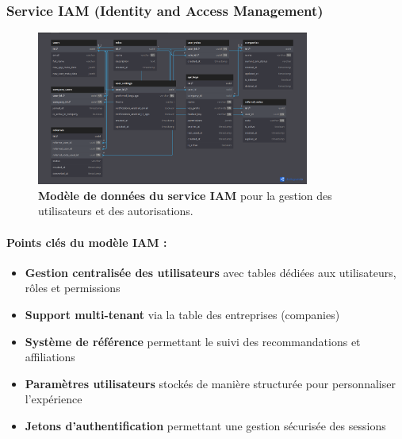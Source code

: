 \subsubsection{Service IAM (Identity and Access Management)}
\begin{figure}[p]
  \centering
  \includegraphics[width=0.8\textwidth,keepaspectratio]{week_1_img/services_db_screanshots/Screenshot 2025-06-06 at 15-08-36 IAM_Service.pdf.png}
  \caption{\textbf{Modèle de données du service IAM} pour la gestion des utilisateurs et des autorisations.}
  \label{fig:iam_service}
\end{figure}

\vspace{5pt}
\small
\paragraph{Points clés du modèle IAM :}
\begin{itemize}[leftmargin=*,noitemsep,topsep=0pt]
  \item \textbf{Gestion centralisée des utilisateurs} avec tables dédiées aux utilisateurs, rôles et permissions
  \item \textbf{Support multi-tenant} via la table des entreprises (companies)
  \item \textbf{Système de référence} permettant le suivi des recommandations et affiliations
  \item \textbf{Paramètres utilisateurs} stockés de manière structurée pour personnaliser l'expérience
  \item \textbf{Jetons d'authentification} permettant une gestion sécurisée des sessions
\end{itemize}
\normalsize
\clearpage

